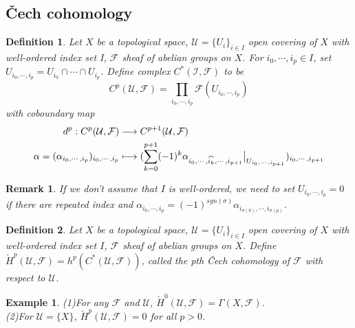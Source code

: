 \documentclass{ctexart}
\newtheorem{definition}{Definition}[section]
\newtheorem{remark}{Remark}[section]
\newtheorem{example}{Example}[section]
\begin{document}
\subsection{Čech cohomology}
\label{subsection:Sheaf_Cohomology_Čech_cohomology}

\begin{definition}
    Let $X$ be a topological space, $\mathcal{U} = \{U_{i}\}_{i\in I}$ open covering of $X$ with well-ordered index set I, $\mathcal{F}$ sheaf of abelian groups on $X$.
    For $i_{0}, \cdots, i_{p}\in I$, set $U_{i_{0}, \cdots, i_{p}} = U_{i_{0}} \cap \cdots \cap U_{i_{p}}$.
    Define complex $C^{\ast}(\mathcal{I}, \mathcal{F})$ to be 
    \begin{equation}
        C^{p}(\mathcal{U}, \mathcal{F}) = \prod_{i_{0}, \cdots, i_{p}} \mathcal{F}(U_{i_{0}, \cdots, i_{p}})
    \end{equation}
    with coboundary map 
    \begin{equation}
        \begin{split}
            d^{p}: C^{p}(\mathcal{U}, \mathcal{F}) & \longrightarrow C^{p + 1}(\mathcal{U}, \mathcal{F}) \\
            \alpha = (\alpha_{i_{0}, \cdots, i_{p}})_{i_{0}, \cdots, i_{p}} & \longmapsto (\sum_{k = 0}^{p + 1} (-1)^{k}\alpha_{i_{0}, \cdots, \widehat{i_{k}}, \cdots, i_{p + 1}}\big{|}_{U_{i_{0}, \cdots, i_{p + 1}}})_{i_{0}, \cdots, i_{p + 1}}
        \end{split}
    \end{equation}
\end{definition}
\begin{remark}
    If we don't assume that $I$ is well-ordered, we need to set $U_{i_{0}, \cdots, i_{p}} = 0$ if there are repeated index and $\alpha_{i_{0}, \cdots, i_{p}} = (-1)^{sgn(\sigma)}\alpha_{i_{\sigma(0)}, \cdots, i_{\sigma(p)}}$.
\end{remark}
\begin{definition}
    Let $X$ be a topological space, $\mathcal{U} = \{U_{i}\}_{i\in I}$ open covering of $X$ with well-ordered index set $I$, $\mathcal{F}$ sheaf of abelian groups on $X$.
    Define $\check{H}^{p}(\mathcal{U}, \mathcal{F}) = h^{p}(C^{\ast}(\mathcal{U}, \mathcal{F}))$, called the pth Čech cohomology of $\mathcal{F}$ with respect to $\mathcal{U}$.
\end{definition}
\begin{example}
    (1)For any $\mathcal{F}$ and $\mathcal{U}$, $\check{H}^{0}(\mathcal{U}, \mathcal{F}) = \Gamma(X, \mathcal{F})$. \\
    (2)For $\mathcal{U} = \{X\}$, $\check{H}^{p}(\mathcal{U}, \mathcal{F}) = 0$ for all $p > 0$.
\end{example}
\end{document}
